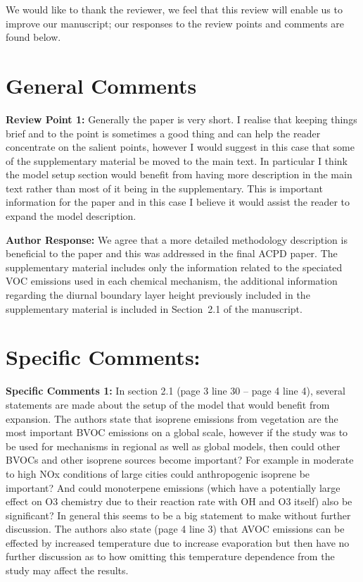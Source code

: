 \documentclass{article}
\begin{document}
We would like to thank the reviewer, we feel that this review will enable us to improve our manuscript; our responses to the review points and comments are found below.

\section*{General Comments}

\textbf{Review Point 1:}  Generally the paper is very short. I realise that keeping things brief and to the point is sometimes a good thing and can help the reader concentrate on the salient points, however I would suggest in this case that some of the supplementary material be moved to the main text. In particular I think the model setup section would benefit from having more description in the main text rather than most of it being in the supplementary. This is important information for the paper and in this case I believe it would assist the reader to expand the model description.

\textbf{Author Response:} We agree that a more detailed methodology description is beneficial to the paper and this was addressed in the final ACPD paper. The supplementary material includes only the information related to the speciated VOC emissions used in each chemical mechanism, the additional information regarding the diurnal boundary layer height previously included in the supplementary material is included in Section~2.1 of the manuscript.

\section*{Specific Comments:}
\textbf{Specific Comments 1:}  In section 2.1 (page 3 line 30 – page 4 line 4), several statements are made about the setup of the model that would benefit from expansion. The authors state that isoprene emissions from vegetation are the most important BVOC emissions on a global scale, however if the study was to be used for mechanisms in regional as well as global models, then could other BVOCs and other isoprene sources become important? For example in moderate to high NOx conditions of large cities could anthropogenic isoprene be important? And could monoterpene emissions (which have a potentially large effect on O3 chemistry due to their reaction rate with OH and O3 itself) also be significant? In general this seems to be a big statement to make without further discussion. The authors also state (page 4 line 3) that AVOC emissions can be effected by increased temperature due to increase evaporation but then have no further discussion as to how omitting this temperature dependence from the study may affect the results.
\end{document}
